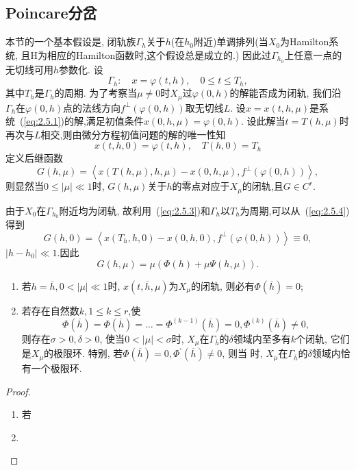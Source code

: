 \subsection{Poincare分岔}
本节的一个基本假设是,
闭轨族$\Gamma_h$关于$h$(在$h_0$附近)单调排列(当$X_0$为Hamilton系统,
且H为相应的Hamilton函数时,这个假设总是成立的.)
因此过$\Gamma_{h_0}$上任意一点的无切线可用$h$参数化.
设
\begin{equation}
  \label{eq:2.5.2}
  \Gamma_{h}: \quad x=\varphi(t, h), \quad 0 \leqslant t \leqslant T_{h},
\end{equation}
其中$T_h$是$\Gamma_h$的周期.
为了考察当$\mu \neq 0$时$X_{\mu}$过$\varphi(0,h)$的解能否成为闭轨,
我们沿$\Gamma_h$在$\varphi(0,h)$点的法线方向$f^{\perp}(\varphi(0, h))$取无切线$L$.
设$x=x(t,h,\mu)$是系统~(\ref{eq:2.5.1})的解,满足初值条件$x(0,h,\mu)=\varphi(0,h)$.
设此解当$t=T(h,\mu)$时再次与$L$相交,则由微分方程初值问题的解的唯一性知
\begin{equation}
  \label{eq:2.5.3}
  x(t, h, 0)=\varphi(t, h), \quad T(h, 0)=T_{h}
\end{equation}
定义后继函数
\begin{equation}
  \label{eq:2.5.4}
  G(h, \mu)=\left\langle x(T(h, \mu), h, \mu)-x(0, h, \mu), f^{\perp}(\varphi(0, h))\right\rangle,
\end{equation}
则显然当$0 \leqslant|\mu| \ll 1$时,
$G(h,\mu)$关于$h$的零点对应于$X_{\mu}$的闭轨,且$G\in C^r$.
\par
由于$X_0$在$\Gamma_{h_0}$附近均为闭轨,
故利用~(\ref{eq:2.5.3})和$\Gamma_h$以$T_h$为周期,可以从~(\ref{eq:2.5.4})得到
$$
G(h, 0)=\left\langle x\left(T_{h}, h, 0\right)-x(0, h, 0), f^{\perp}(\varphi(0, h))\right\rangle \equiv 0,
$$
$\left|h-h_{0}\right| \ll 1$.因此
\begin{equation}
  \label{eq:2.5.5}
  G(h, \mu)=\mu(\Phi(h)+\mu \Psi(h, \mu)).
\end{equation}
\begin{theorem}
  \label{thm:2.5.1}
  \begin{enumerate}
  \item\label{item:25}
    若$h=\overline{h}, 0<|\mu| \ll 1$时,
    $x(t, \overline{h}, \mu)$为$X_{\mu}$的闭轨,
    则必有$\Phi(\overline{h}) = 0$;
  \item\label{item:26}
    若存在自然数$k, 1 \leqslant k \leqslant r$,使
    \begin{equation}
      \label{eq:2.5.6}
      \Phi(\overline{h})=\Phi(\overline{h})=\dots=\Phi^{(k-1)}(\overline{h})=0, \Phi^{(k)}(\overline{h}) \neq 0,
    \end{equation}
    则存在$\sigma>0, \delta>0$,
    使当$0<|\mu|<\sigma$时,
    $X_{\mu}$在$\Gamma_{\overline{h}}$的$\delta$领域内至多有$k$个闭轨,
    它们是$X_{\mu}$的极限环.
    特别,
    若$\Phi(\overline{h})=0, \Phi^{\prime}(\overline{h}) \neq 0$,
    则当
    时,
    $X_{\mu}$在$\Gamma_{\overline{h}}$的$\delta$领域内恰有一个极限环.
  \end{enumerate}
\end{theorem}
\begin{proof}
  \begin{enumerate}
\item\label{item:27}
    若
  \item\label{item:28}
    
  \end{enumerate}
\end{proof}
